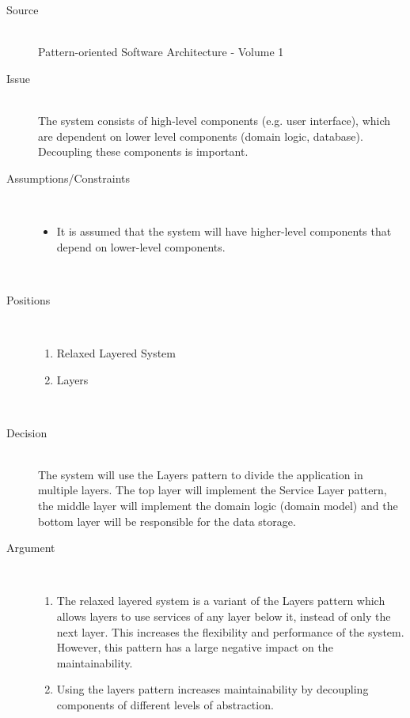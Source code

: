 \begin{description}
\item [Source]~\\
Pattern-oriented Software Architecture - Volume 1 \cite{wiley-1}

\item [Issue]~\\
The system consists of high-level components (e.g. user interface), which are dependent on lower level components (domain logic, database). Decoupling these components is important.

\item [Assumptions/Constraints]~
\begin{itemize}
\item It is assumed that the system will have higher-level components that depend on lower-level components.
\end{itemize}
~\\[-1.5cm]

\item [Positions]~
\begin{enumerate}
\item Relaxed Layered System
\item Layers
\end{enumerate}
~\\[-1.5cm]

\item [Decision] ~\\
The system will use the Layers pattern to divide the application in multiple layers. The top layer will implement the Service Layer pattern, the middle layer will implement the domain logic (domain model) and the bottom layer will be responsible for the data storage.

\item [Argument]~
\begin{enumerate}
\item The relaxed layered system is a variant of the Layers pattern which allows layers to use services of any layer below it, instead of only the next layer. This increases the flexibility and performance of the system. However, this pattern has a large negative impact on the maintainability.

\item 
Using the layers pattern increases maintainability by decoupling components of different levels of abstraction.

\end{enumerate}


\end{description}
